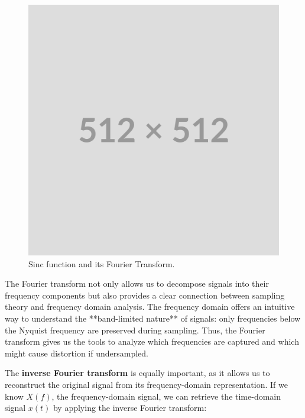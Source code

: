 \begin{figure}[!h]
  \centering
  \includegraphics[width=0.85\linewidth]{img/placeholder512.png}
  \caption{Sinc function and its Fourier Transform.}
  \label{f:sinc-and-rect}
\end{figure}


The Fourier transform not only allows us to decompose signals into their frequency components but also provides a clear connection between sampling theory and frequency domain analysis. The frequency domain offers an intuitive way to understand the **band-limited nature** of signals: only frequencies below the Nyquist frequency are preserved during sampling. Thus, the Fourier transform gives us the tools to analyze which frequencies are captured and which might cause distortion if undersampled.


The \textbf{inverse Fourier transform} is equally important, as it allows us to reconstruct the original signal from its frequency-domain representation. If we know \( X(f) \), the frequency-domain signal, we can retrieve the time-domain signal \( x(t) \) by applying the inverse Fourier transform:


